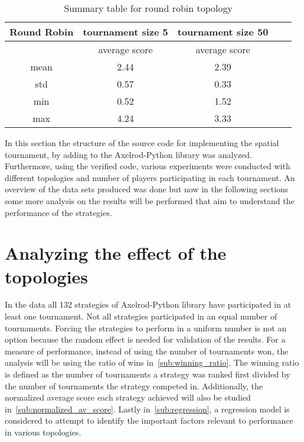 \begin{table}[H]
	\centering
	\begin{adjustbox}{width=0.5\textwidth,height=0.15\textwidth}
		\small
		\begin{tabular}{ccccc}
				\toprule
		Round Robin & \multicolumn{1}{|c|}{tournament size 5} & \multicolumn{1}{c}{tournament size 50} \\ \hline

		            & average score                          & average score                           \\ \hline
		mean        & 2.44                                   & 2.39                                    \\ \hline
		std         & 0.57                                   & 0.33                                    \\ \hline
		min         & 0.52                                   & 1.52                                    \\ \hline
		max         & 4.24                                   & 3.33                                    \\ \bottomrule
	\end{tabular}
\end{adjustbox}
	\caption{Summary table for round robin topology}
	\label{sum-rr}
\end{table}

In this section the structure of the source code for implementing the spatial
tournament, by adding to the Axelrod-Python library was analyzed. Furthermore,
using the verified code, various experiments were conducted with different
topologies
and number of players participating in each tournament. An overview of the
data sets produced was done but now in the following sections
some more analysis on the results will be performed that aim to understand
the performance of the strategies.

\section{Analyzing the effect of the topologies}
\label{sub:analyzing_the_effect_of_the_topologies}
In the data all 132 strategies of Axelrod-Python library have participated in at
least one tournament. Not all strategies participated in an equal number of tournaments.
Forcing the strategies to perform in a uniform number is
not an option because the random effect is needed for validation of the
results. For a measure of
performance, instead of using the number of tournaments won, the analysis will
be using the ratio of wins in~\autoref{sub:winning_ratio}.
The winning ratio is defined as the number of tournaments a strategy was ranked
first divided by the number of tournaments the strategy competed in.
Additionally, the normalized average score each strategy
achieved will also be studied in~\autoref{sub:normalized_av_score}.
Lastly in~\autoref{sub:regression}, a regression model is considered to
attempt to identify the important factors relevant to performance in various
topologies.

